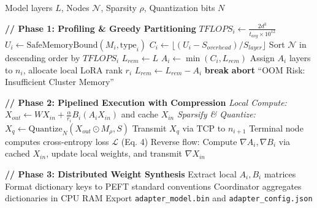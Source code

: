 \documentclass{ieeeaccess}
\begin{document}
\begin{algorithm}[t]
\caption{LoraLink: Hardware-Aware Partitioning and Execution}
\small
\begin{algorithmic}[1]
\renewcommand{\algorithmicrequire}{\textbf{Input:}}
\REQUIRE Model layers $L$, Nodes $\mathcal{N}$, Sparsity $\rho$, Quantization bits $N$
\vspace{0.15cm}

\STATE \textbf{// Phase 1: Profiling \& Greedy Partitioning}
    \STATE $TFLOPS_i \gets \frac{2d^3}{t_{avg} \times 10^{12}}$ 
    \STATE $U_i \gets \text{SafeMemoryBound}(M_i, \text{type}_i)$ 
    \STATE $C_i \gets \lfloor (U_i - S_{overhead}) / S_{layer} \rfloor$ 
\ENDFOR
\STATE Sort $\mathcal{N}$ in descending order by $TFLOPS_i$
\STATE $L_{rem} \gets L$ 
    \STATE $A_i \gets \min(C_i, L_{rem})$ 
    \STATE Assign $A_i$ layers to $n_i$, allocate local LoRA rank $r_i$
    \STATE $L_{rem} \gets L_{rem} - A_i$
        \STATE \textbf{break}
    \ENDIF
\ENDFOR
{}
    \STATE \textbf{abort} ``OOM Risk: Insufficient Cluster Memory''
\ENDIF
\vspace{0.15cm}

\STATE \textbf{// Phase 2: Pipelined Execution with Compression}
        \STATE \textit{Local Compute:} $X_{out} \gets WX_{in} + \frac{\alpha}{r_i}B_i(A_i X_{in})$ and cache $X_{in}$
        \STATE \textit{Sparsify \& Quantize:} $X_q \gets \text{Quantize}_N(X_{out} \odot M_{\rho}, S)$
        \STATE Transmit $X_q$ via TCP to $n_{i+1}$
    \ENDFOR
    \STATE Terminal node computes cross-entropy loss $\mathcal{L}$ (Eq. 4)
    \STATE Reverse flow: Compute $\nabla A_i, \nabla B_i$ via cached $X_{in}$, update local weights, and transmit $\nabla X_{in}$
\ENDWHILE
\vspace{0.15cm}

\STATE \textbf{// Phase 3: Distributed Weight Synthesis}
    \STATE Extract local $A_i, B_i$ matrices
    \STATE Format dictionary keys to PEFT standard conventions
\ENDFOR
\STATE Coordinator aggregates dictionaries in CPU RAM
\STATE Export \texttt{adapter\_model.bin} and \texttt{adapter\_config.json}
\end{algorithmic}
\end{algorithm}
\end{document}
